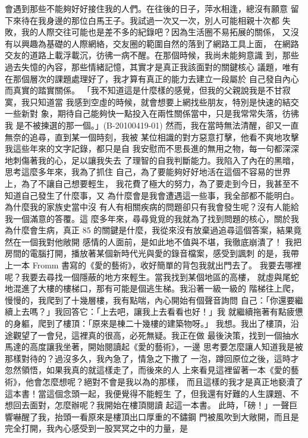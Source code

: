 會遇到那些不能夠好好接住我的人們。在往後的日子，萍水相逢，總沒有願意
留下來待在我身邊的那位白馬王子。我試過一次又一次，別人可能相親十次都
失敗，我的人際交往可能也是差不多的紀錄吧？因為生活圈不易拓展的關係，
又沒有以興趣為基礎的人際網絡，交友圈的範圍自然的落到了網路工具上面，
在網路交友的道路上載浮載沉，彷彿一病不醒。在那個時候，我尚未能夠意識
到，那些過去失憶的內容，那些情緒記憶，其實才是真正我該面對的關鍵核心
議題，唯有在那個層次的課題處理好了，我才算有真正的能力去建立一段屬於
自己發自內心而真實的踏實關係。 
「我不知道這是什麼樣的感覺，但我的父親說我是不甘寂寞，我只知道當
我感到空虛的時候，就會想要上網找些朋友，特別是快速的結交一些新對
象，期待自己能夠快一點投入在兩性關係當中，只是我常常失落，彷彿我
是不被揀選的那一個。」(B-20100419-01) 
然而，我在當時無法清醒，卻又一直無奈的追尋，直到某一個時刻，我被
某位相識的對方惡意打擊，他看不爽地攻擊我這些年來的文字記錄，都只是自
我安慰而不思長進的無用之物，每一句都深深地刺傷著我的心，足以讓我失去
了理智的自我判斷能力。我陷入了內在的黑暗，思考這麼多年來，我為了抓住
自己，為了要能夠好好地活在這個不容易的世界上，為了不讓自己想要輕生，
我花費了極大的努力，為了要走到今日，我甚至不知道自己發生了什麼事，又
為什麼會是我會遭遇這一些事，我全部都不能明白。為什麼我的家族史當中沒
有人有相關疾病的問題卻只有我會發生呢？沒有人能給我一個滿意的答覆。這
麼多年來，尋尋覓覓的我就為了找到問題的核心，關於我為什麼會生病，真正
85 
的關鍵是什麼，我從來沒有放棄過追尋這個答案，結果竟然在一個我對他敞開
感情的人面前，是如此地不值與不堪，我徹底崩潰了！ 
我把房間的電腦打開，播放著某個新時代光與愛的錄音檔案，感受到諷刺
的是，我帶上一本 Fromm 書寫的《愛的藝術》，收好簡單的背包我就出門去了。
我要去哪裡呢？我要去尋找一個隱蔽的地方來輕生。當我找到某個地區的高樓，
就虛與尾蛇地混進了大樓的樓梯口，那有可能是個逃生梯。我沿著一級一級的
階梯往上爬，慢慢的，我爬到了十幾層樓，我有點喘，內心開始有個聲音詢問
自己：「你還要繼續上去嗎？」我回答它：「上去吧，讓我上去看看也好！」我
就繼續拖著有點疲憊的身軀，爬到了樓頂：「原來是棟二十幾樓的建築物呀。」
我想。我出了樓頂，沿途觀望了一會兒，這裡真的很高，必死無疑。我正在做
最後決策，找到一個抽水馬達的高度讓我坐著，開始閱讀起《愛的藝術》，一邊
思考要怎麼讓人知道我是被那樣對待的？過沒多久，我內急了，情急之下撒了
一泡，蹲回原位之後，這時才忽然領悟，如果我真的就這樣走了，而後來的人
上來看見這裡留著一本《愛的藝術》，他會怎麼想呢？絕對不會是我以為的那樣，
而且這樣的我才是真正地褻瀆了這本書！當這個念頭一起，我便覺得不能輕生
了，但我還有好難的人生課題、不想回去面對，怎麼辦呢？我開始在樓頂閱讀
起這一本書。 
此時，「磅！」一聲巨響嚇醒了我，抬頭一看原來是樓頂出口厚重的不鏽鋼
門被風吹到大敞開，而且是完全打開，我內心感受到一股冥冥之中的力量，是
